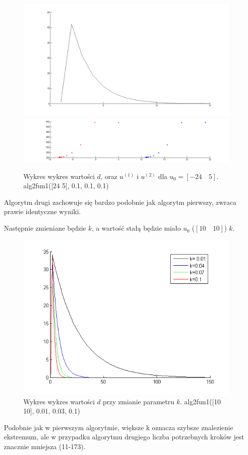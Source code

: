 \documentclass[a4paper,10pt]{article}
\begin{document}
\begin{figure}[!h]
    \centering
	\includegraphics[width=120mm]{CW4-alg2fun1-u-24_5-k01-d.png}
	\includegraphics[width=120mm]{CW4-alg2fun1-u-24_5-k01-u.png}
	\caption{Wykres wykres wartości $d$, oraz $u^{(1)}$ i $u^{(2)}$ dla $u_0=[-24 \quad 5]$. \newline \small alg2fun1([24 5], 0.1, 0.1, 0.1)}
    \label{fig:Rysunek}
\end{figure}

Algorytm drugi zachowuje się bardzo podobnie jak algorytm pierwszy, zwraca prawie identyczne wyniki.

Następnie zmieniane będzie $k$, a wartość stałą będzie miało  $u_0$ ($[10 \quad 10]$) $k$.

\begin{figure}[!h]
    \centering
	\includegraphics[width=120mm]{CW4-alg2fun1-u10_10-k001_01-d.png}
	\caption{Wykres wykres wartości $d$ przy zmianie parametru $k$. \newline \small alg2fun1([10 10], 0.01, 0.03, 0.1)}
    \label{fig:Rysunek}
\end{figure}
\newpage
Podobnie jak w pierwszym algorytmie, większe k oznacza szybsze znalezienie ekstremum, ale w przypadku algorytmu drugiego liczba potrzebnych kroków jest znacznie mniejsza (11-173).
\end{document}
